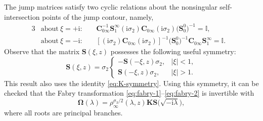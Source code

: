 \documentclass[pdftex]{sigma}
\numberwithin{equation}{section}
\newcommand{\ii}{\mathrm{i}}
\begin{document}
The jump matrices satisfy two cyclic relations about the nonsingular self-intersection points of the jump contour, namely,
 \begin{alignat*}{3}
 &\text{about}\ \xi = +\ii\colon\ &&\mathbf{C}_{0\infty}^{-1} \mathbf{S}_1^\infty (\ii \sigma_2) \mathbf{C}_{0\infty} (\ii \sigma_2) \big(\mathbf{S}_0^0\big)^{-1} = \mathbb{I}, &\\
 &\text{about}\ \xi = -\ii\colon\ &&\left[(\ii \sigma_2) \mathbf{C}_{0\infty} (\ii \sigma_2)\right]^{-1} \big(\mathbf{S}_{0}^0\big)^{-1}\mathbf{C}_{0\infty}\mathbf S_1^\infty = \mathbb{I}.&
\end{alignat*}
Observe that the matrix ${\mathbf{S}}(\xi, z)$ possesses the following useful symmetry:
\begin{equation}
{\mathbf{S}}(\xi, z) = \sigma_2 \begin{cases}
 -{\mathbf{S}}(-\xi, z) \sigma_2, & |\xi|<1, \\
{\mathbf{S}}(-\xi, z) \sigma_2, & |\xi|>1.
\label{eq:S-symmetry}
\end{cases}
\end{equation}
This result also uses the identity \eqref{eq:K-symmetry}. Using this symmetry, it can be checked that the Fabry transformation \eqref{eq:fabry-1}--\eqref{eq:fabry-2} is invertible with{\samepage
\begin{equation}
\mathbf \Omega(\lambda ) = \rho_\infty^{\sigma_3/2}(\lambda, z) \mathbf{K} \mathbf S\big(\sqrt{-\ii \lambda}\big),
\label{eq:inverse-fabry}
\end{equation}
where all roots are principal branches.}
\end{document}
